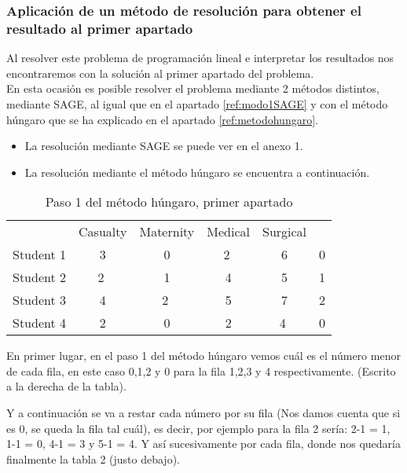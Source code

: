\documentclass[11pt]{article}
\begin{document}
\subsubsection{Aplicación de un método de resolución para obtener el resultado al primer apartado}

Al resolver este problema de programación lineal e interpretar los resultados nos encontraremos con la solución al primer apartado del problema.\\

En esta ocasión es posible resolver el problema mediante 2 métodos distintos, mediante SAGE, al igual que en el apartado \ref{ref:modo1SAGE} y con el método húngaro que se ha explicado en el apartado \ref{ref:metodohungaro}.

\begin{itemize}
    \item La resolución mediante SAGE se puede ver en el anexo 1.
    \item La resolución mediante el método húngaro se encuentra a continuación.\\
\end{itemize}


\begin{table}[H]
\centering
\begin{tabular}{lccccl}
\cline{1-5}
 & \multicolumn{1}{l}{Casualty} & \multicolumn{1}{l}{Maternity} & \multicolumn{1}{l}{Medical} & \multicolumn{1}{l}{Surgical} &  \\ \cline{1-5}
Student 1 & 3 & 0 & \textcircled{2} & 6 & 0 \\
Student 2 & \textcircled{2} & 1 & 4 & 5 & 1 \\
Student 3 & 4 & \textcircled{2} & 5 & 7 & 2 \\
Student 4 & 2 & 0 & 2 & \textcircled{4} & 0 \\ \cline{1-5}
\end{tabular}
\caption{Paso 1 del método húngaro, primer apartado}
\end{table}

En primer lugar, en el paso 1 del método húngaro vemos cuál es el número menor de cada fila, en este caso 0,1,2 y 0 para la fila 1,2,3 y 4 respectivamente. (Escrito a la derecha de la tabla).

Y a continuación se va a restar cada número por su fila (Nos damos cuenta que si es 0, se queda la fila tal cuál), es decir, por ejemplo para la fila 2 sería: 2-1 = 1, 1-1 = 0, 4-1 = 3 y 5-1 = 4. Y así sucesivamente por cada fila, donde nos quedaría finalmente la tabla 2 (justo debajo).\\
\end{document}
